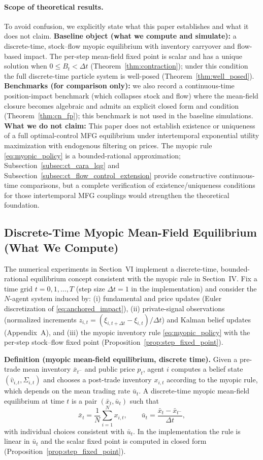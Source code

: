 \paragraph{Scope of theoretical results.}
To avoid confusion, we explicitly state what this paper establishes and what it does not claim.
\textbf{Baseline object (what we compute and simulate):} a discrete-time, stock--flow myopic equilibrium with inventory carryover and flow-based impact. The per-step mean-field fixed point is scalar and has a unique solution when $0\le B_t<\Delta t$ (Theorem~\ref{thm:contraction}); under this condition the full discrete-time particle system is well-posed (Theorem~\ref{thm:well_posed}).
\textbf{Benchmarks (for comparison only):} we also record a continuous-time position-impact benchmark (which collapses stock and flow) where the mean-field closure becomes algebraic and admits an explicit closed form and condition (Theorem~\ref{thm:cn_fp}); this benchmark is not used in the baseline simulations.
\textbf{What we do not claim:} This paper does not establish existence or uniqueness of a full optimal-control MFG equilibrium under intertemporal exponential utility maximization with endogenous filtering on prices. The myopic rule \eqref{eq:myopic_policy} is a bounded-rational approximation; Subsection~\ref{subsec:ct_cara_lqg} and Subsection~\ref{subsec:ct_flow_control_extension} provide constructive continuous-time comparisons, but a complete verification of existence/uniqueness conditions for those intertemporal MFG couplings would strengthen the theoretical foundation.

\subsection{Discrete-Time Myopic Mean-Field Equilibrium (What We Compute)}

The numerical experiments in Section~VI implement a discrete-time, bounded-rational equilibrium concept consistent with the myopic rule in Section~IV. Fix a time grid $t=0,1,\dots,T$ (step size $\Delta t=1$ in the implementation) and consider the $N$-agent system induced by:
(i) fundamental and price updates (Euler discretization of \eqref{eq:anchored_impact}),
(ii) private-signal observations (normalized increments $z_{i,t}=(\xi_{i,t+\Delta t}-\xi_{i,t})/\Delta t$) and Kalman belief updates (Appendix~A), and
(iii) the myopic inventory rule \eqref{eq:myopic_policy} with the per-step stock--flow fixed point (Proposition~\ref{prop:step_fixed_point}).

\textbf{Definition (myopic mean-field equilibrium, discrete time).}
Given a pre-trade mean inventory $\bar x_{t^-}$ and public price $p_t$, agent $i$ computes a belief state $(\hat v_{i,t},\Sigma_{i,t})$ and chooses a post-trade inventory $x_{i,t}$ according to the myopic rule, which depends on the mean trading rate $\bar u_t$. A discrete-time myopic mean-field equilibrium at time $t$ is a pair $(\bar x_t,\bar u_t)$ such that
\[
\bar x_t = \frac{1}{N}\sum_{i=1}^N x_{i,t},
\qquad
\bar u_t=\frac{\bar x_t-\bar x_{t^-}}{\Delta t},
\]
with individual choices consistent with $\bar u_t$. In the implementation the rule is linear in $\bar u_t$ and the scalar fixed point is computed in closed form (Proposition~\ref{prop:step_fixed_point}).

